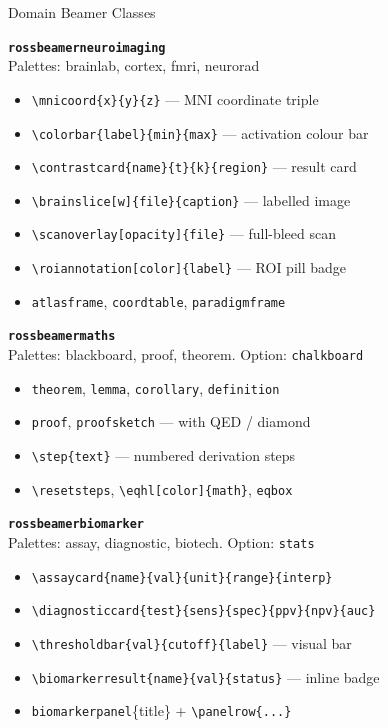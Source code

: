 \documentclass[palette=lancet]{rossbeamerscientific}
\newcommand{\cmd}[1]{\texttt{\color{rbAccent}\textbackslash #1}}
\newcommand{\env}[1]{\texttt{\color{rbSecondary}#1}}
\newcommand{\cls}[1]{\texttt{\color{rbPrimary}\bfseries #1}}
\newcommand{\opt}[1]{\texttt{\color{rbAccentDark}#1}}
\begin{document}
\begin{frame}{Domain Beamer Classes}
\scriptsize
\begin{twocol}[0.47]
  \textbf{\cls{rossbeamerneuroimaging}}\\
  Palettes: brainlab, cortex, fmri, neurorad
  \begin{itemize}\setlength\itemsep{0pt}
    \item \cmd{mnicoord\{x\}\{y\}\{z\}} --- MNI coordinate triple
    \item \cmd{colorbar\{label\}\{min\}\{max\}} --- activation colour bar
    \item \cmd{contrastcard\{name\}\{t\}\{k\}\{region\}} --- result card
    \item \cmd{brainslice[w]\{file\}\{caption\}} --- labelled image
    \item \cmd{scanoverlay[opacity]\{file\}} --- full-bleed scan
    \item \cmd{roiannotation[color]\{label\}} --- ROI pill badge
    \item \env{atlasframe}, \env{coordtable}, \env{paradigmframe}
  \end{itemize}
  \vskip4pt

  \textbf{\cls{rossbeamermaths}}\\
  Palettes: blackboard, proof, theorem.  Option: \opt{chalkboard}
  \begin{itemize}\setlength\itemsep{0pt}
    \item \env{theorem}, \env{lemma}, \env{corollary}, \env{definition}
    \item \env{proof}, \env{proofsketch} --- with QED / diamond
    \item \cmd{step\{text\}} --- numbered derivation steps
    \item \cmd{resetsteps}, \cmd{eqhl[color]\{math\}}, \env{eqbox}
  \end{itemize}
  \vskip4pt

  \textbf{\cls{rossbeamerbiomarker}}\\
  Palettes: assay, diagnostic, biotech.  Option: \opt{stats}
  \begin{itemize}\setlength\itemsep{0pt}
    \item \cmd{assaycard\{name\}\{val\}\{unit\}\{range\}\{interp\}}
    \item \cmd{diagnosticcard\{test\}\{sens\}\{spec\}\{ppv\}\{npv\}\{auc\}}
    \item \cmd{thresholdbar\{val\}\{cutoff\}\{label\}} --- visual bar
    \item \cmd{biomarkerresult\{name\}\{val\}\{status\}} --- inline badge
    \item \env{biomarkerpanel}\{title\} + \cmd{panelrow\{...\}}
  \end{itemize}
  \vskip4pt


\end{twocol}
\end{frame}
\end{document}
